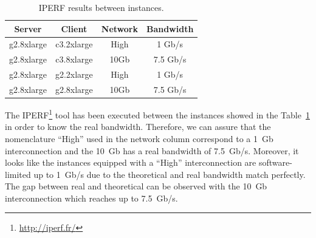 \documentclass[a4paper,twoside]{article}
\begin{document}
\begin{table}[htb]
\renewcommand{\arraystretch}{1.3}
\caption{IPERF results between instances.}
\label{table:iperf}
\tabcolsep=0.24cm
\begin{center}\begin{tabular}{cccc}
Server & Client & Network & Bandwidth\\ \hline \hline
g2.8xlarge & c3.2xlarge & High & 1  Gb/s\\ \hline
g2.8xlarge & c3.8xlarge & 10Gb & 7.5  Gb/s\\ \hline
g2.8xlarge & g2.2xlarge & High & 1 Gb/s\\ \hline
g2.8xlarge & g2.8xlarge & 10Gb & 7.5  Gb/s\\ \hline
\end{tabular}\end{center}\end{table}

The IPERF\footnote{\url{http://iperf.fr/}} tool has been executed between the instances showed in 
the Table~\ref{table:iperf} in order to know the real bandwidth.
Therefore, we can assure that the nomenclature ``High'' used in the 
network column correspond to a 1~Gb interconnection and the 10~Gb has 
a real bandwidth of 7.5~Gb/s.
Moreover, it looks like the instances equipped with a ``High'' interconnection 
are software-limited up to 1~Gb/s due to the theoretical and real bandwidth 
match perfectly. The gap between real and theoretical can be observed with 
the 10~Gb interconnection which reaches up to 7.5~Gb/s.
\end{document}
